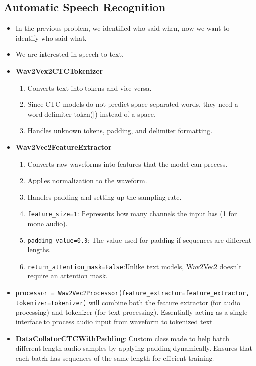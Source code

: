\documentclass[a4paper]{article}
\begin{document}
\subsection{Automatic Speech Recognition}
\begin{itemize}
    \item In the previous problem, we identified who said when, now we want to identify who said what.
    \item We are interested in speech-to-text.
    \item \textbf{Wav2Vex2CTCTokenizer}
    \begin{enumerate}
        \item Converts text into tokens and vice versa.
        \item Since CTC models do not predict space-separated words, they need a word delimiter token($|$) instead of a space.
        \item Handles unknown tokens, padding, and delimiter formatting.
    \end{enumerate}
    \item \textbf{Wav2Vec2FeatureExtractor}
    \begin{enumerate}
        \item Converts raw waveforms into features that the model can process.
        \item Applies normalization to the waveform.
        \item Handles padding and setting up the sampling rate.
        \item \verb|feature_size=1|: Represents how many channels the input has (1 for mono audio).
        \item \verb|padding_value=0.0|: The value used for padding if sequences are different lengths.
        \item \verb|return_attention_mask=False|:Unlike text models, Wav2Vec2 doesn’t require an attention mask.
    \end{enumerate}
    \item \verb|processor = Wav2Vec2Processor(feature_extractor=feature_extractor, tokenizer=tokenizer)| will combine both the feature extractor (for audio processing) and tokenizer (for text processing). Essentially acting as a single interface to process audio input from waveform to tokenized text.
    \item \textbf{DataCollatorCTCWithPadding}: Custom class made to help batch different-length audio samples by applying padding dynamically. Ensures that each batch has sequences of the same length for efficient training.

\end{itemize}
\end{document}

